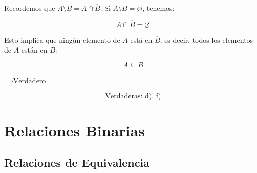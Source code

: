 \documentclass[a4paper,12pt]{article}
\begin{document}
\begin{ejercicio}[title=Ejercicio 10]
\begin{itemize}
Recordemos que $A\setminus B = A \cap \overline{B}$. Si $A\setminus B = \varnothing$, tenemos:

\[
A \cap \overline{B} = \varnothing
\]

Esto implica que ningún elemento de $A$ está en $\overline{B}$, es decir, todos los elementos de $A$ están en $B$:

\[
A \subseteq B
\]

\(\Rightarrow \text{Verdadero}\)
\end{itemize}

\[
\boxed{\text{Verdaderas: d), f)}}
\]

\end{ejercicio}

\section{Relaciones Binarias}

\subsection{Relaciones de Equivalencia}
\end{document}
